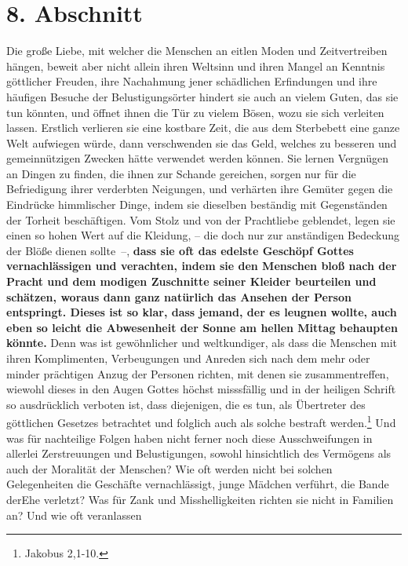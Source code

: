 \section{8. Abschnitt} \label{kap15_ab8}

Die große Liebe, mit welcher die Menschen an eitlen Moden und Zeitvertreiben
hängen, beweit aber nicht allein ihren Weltsinn und ihren Mangel an Kenntnis
göttlicher Freuden, ihre Nachahmung jener schädlichen Erfindungen und ihre
häufigen Besuche der Belustigungsörter hindert sie auch an vielem Guten, das
sie tun könnten, und öffnet ihnen die Tür zu vielem Bösen, wozu sie sich
verleiten lassen. Erstlich verlieren sie eine kostbare Zeit, die aus dem
Sterbebett eine ganze Welt aufwiegen würde, dann verschwenden sie das Geld,
welches zu besseren und gemeinnützigen Zwecken hätte verwendet werden können.
Sie lernen Vergnügen an Dingen zu finden, die ihnen zur Schande gereichen,
sorgen
nur für die Befriedigung ihrer verderbten Neigungen, und verhärten ihre Gemüter
gegen die Eindrücke himmlischer Dinge, indem sie dieselben beständig mit
Gegenständen der Torheit beschäftigen. Vom Stolz und von der Prachtliebe
geblendet, legen sie einen so hohen Wert auf die Kleidung, -- die doch nur zur
anständigen Bedeckung der Blöße dienen sollte~--, \textbf{dass sie oft das
edelste
Geschöpf Gottes vernachlässigen und verachten, indem sie den Menschen bloß nach
der Pracht und dem modigen Zuschnitte seiner Kleider beurteilen und schätzen,
woraus dann ganz natürlich das Ansehen der Person entspringt. Dieses ist so
klar, dass jemand, der es leugnen wollte, auch eben so leicht die Abwesenheit
der
Sonne am hellen Mittag behaupten könnte.} Denn was ist gewöhnlicher und
weltkundiger, als dass die Menschen mit ihren Komplimenten, Verbeugungen und
Anreden sich nach dem mehr oder minder prächtigen Anzug der Personen richten,
mit denen sie zusammentreffen, wiewohl dieses in den Augen Gottes höchst
misssfällig und in der heiligen Schrift so ausdrücklich verboten ist, dass
diejenigen, die es tun, als Übertreter des göttlichen Gesetzes betrachtet und
folglich auch als solche bestraft werden.\footnote{Jakobus 2,1-10.}
Und was für nachteilige
Folgen haben nicht ferner noch diese Ausschweifungen in allerlei Zerstreuungen
und Belustigungen, sowohl hinsichtlich des Vermögens als auch der Moralität der
Menschen? Wie oft werden nicht bei solchen Gelegenheiten die Geschäfte
vernachlässigt, junge Mädchen verführt, die Bande derEhe
verletzt? Was für Zank
und Misshelligkeiten richten sie nicht in Familien an? Und wie oft veranlassen
